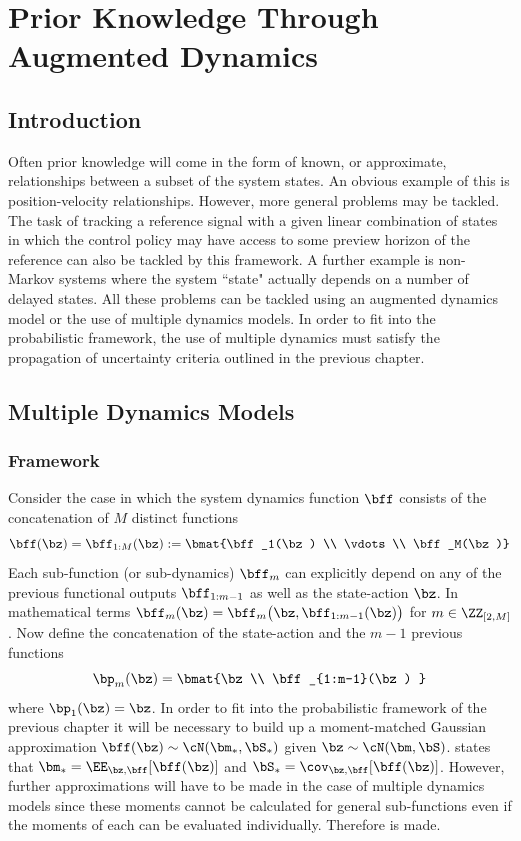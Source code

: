 \chapter{Prior Knowledge Through Augmented Dynamics} \thispagestyle{empty}


\section{Introduction}
Often prior knowledge will come in the form of known, or approximate, relationships between a subset of the system states. An obvious example of this is position-velocity relationships. However, more general problems may be tackled. The task of tracking a reference signal with a given linear combination of states in which the control policy may have access to some preview horizon of the reference can also be tackled by this framework. A further example is non-Markov systems where the system ``state" actually depends on a number of delayed states. All these problems can be tackled using an augmented dynamics model or the use of multiple dynamics models. In order to fit into the probabilistic framework, the use of multiple dynamics must satisfy the propagation of uncertainty criteria outlined in the previous chapter.


\section{Multiple Dynamics Models}
\subsection{Framework}

Consider the case in which the system dynamics function $\bff$ consists of the concatenation of $M$ distinct functions
\begin{equation}
\bff(\bz) = \bff_{1:M}(\bz) := \bmat{\bff_1(\bz) \\ \vdots \\ \bff_M(\bz)}
\label{eqn:multimodel}
\end{equation}
Each sub-function (or sub-dynamics) $\bff_m$ can explicitly depend on any of the previous functional outputs $\bff_{1:m-1}$ as well as the state-action $\bz$. In mathematical terms $\bff_m(\bz) = \bff_m\big(\bz,\bff_{1:m-1}(\bz)\big)$ for $m \in \ZZ_{[2,M]}$. Now define the concatenation of the state-action and the $m-1$ previous functions
\begin{equation}
\bp_m(\bz) = \bmat{\bz \\ \bff_{1:m-1}(\bz) }
\end{equation}
where $\bp_1(\bz) = \bz$.
%
In order to fit into the probabilistic framework of the previous chapter it will be necessary to build up a moment-matched Gaussian approximation $\bff(\bz) \sim \cN(\bm_*, \bS_*)$ given $\bz \sim \cN(\bm,\bS)$.  states that $\bm_* = \EE_{\bz,\bff}[\bff(\bz)]$ and $\bS_* = \cov_{\bz,\bff}[\bff(\bz)]$. However, further approximations will have to be made in the case of multiple dynamics models since these moments cannot be calculated for general sub-functions even if the moments of each can be evaluated individually. Therefore  is made.

